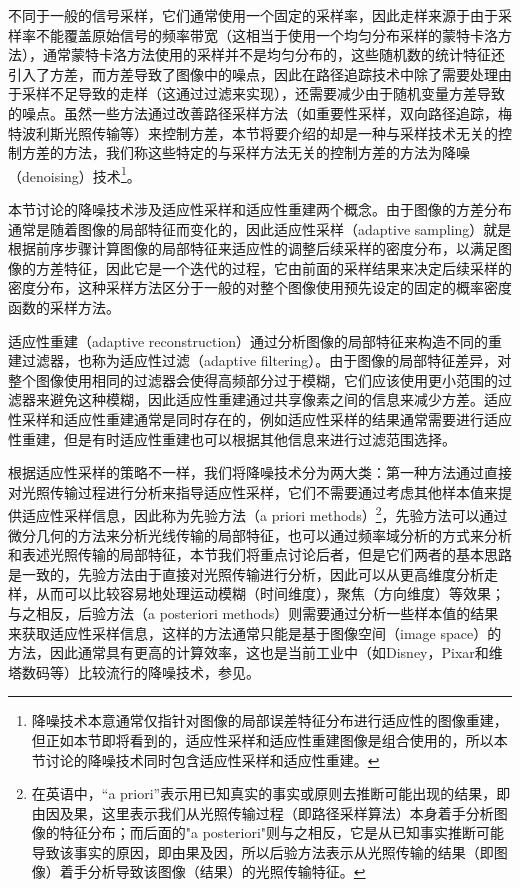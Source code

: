 不同于一般的信号采样，它们通常使用一个固定的采样率，因此走样来源于由于采样率不能覆盖原始信号的频率带宽（这相当于使用一个均匀分布采样的蒙特卡洛方法），通常蒙特卡洛方法使用的采样并不是均匀分布的，这些随机数的统计特征还引入了方差，而方差导致了图像中的噪点，因此在路径追踪技术中除了需要处理由于采样不足导致的走样（这通过过滤来实现），还需要减少由于随机变量方差导致的噪点。虽然一些方法通过改善路径采样方法（如重要性采样，双向路径追踪，梅特波利斯光照传输等）来控制方差，本节将要介绍的却是一种与采样技术无关的控制方差的方法，我们称这些特定的与采样方法无关的控制方差的方法为降噪（denoising）技术\footnote{降噪技术本意通常仅指针对图像的局部误差特征分布进行适应性的图像重建，但正如本节即将看到的，适应性采样和适应性重建图像是组合使用的，所以本节讨论的降噪技术同时包含适应性采样和适应性重建。}。

本节讨论的降噪技术涉及适应性采样和适应性重建两个概念。由于图像的方差分布通常是随着图像的局部特征而变化的，因此适应性采样（adaptive sampling）就是根据前序步骤计算图像的局部特征来适应性的调整后续采样的密度分布，以满足图像的方差特征，因此它是一个迭代的过程，它由前面的采样结果来决定后续采样的密度分布，这种采样方法区分于一般的对整个图像使用预先设定的固定的概率密度函数的采样方法。

适应性重建（adaptive reconstruction）通过分析图像的局部特征来构造不同的重建过滤器，也称为适应性过滤（adaptive filtering）。由于图像的局部特征差异，对整个图像使用相同的过滤器会使得高频部分过于模糊，它们应该使用更小范围的过滤器来避免这种模糊，因此适应性重建通过共享像素之间的信息来减少方差。适应性采样和适应性重建通常是同时存在的，例如适应性采样的结果通常需要进行适应性重建，但是有时适应性重建也可以根据其他信息来进行过滤范围选择。

根据适应性采样的策略不一样，我们将降噪技术分为两大类：第一种方法通过直接对光照传输过程进行分析来指导适应性采样，它们不需要通过考虑其他样本值来提供适应性采样信息，因此称为先验方法（a priori methods）\footnote{在英语中，“a priori”表示用已知真实的事实或原则去推断可能出现的结果，即由因及果，这里表示我们从光照传输过程（即路径采样算法）本身着手分析图像的特征分布；而后面的"a posteriori"则与之相反，它是从已知事实推断可能导致该事实的原因，即由果及因，所以后验方法表示从光照传输的结果（即图像）着手分析导致该图像（结果）的光照传输特征。}，先验方法可以通过微分几何的方法来分析光线传输的局部特征，也可以通过频率域分析的方式来分析和表述光照传输的局部特征，本节我们将重点讨论后者，但是它们两者的基本思路是一致的，先验方法由于直接对光照传输进行分析，因此可以从更高维度分析走样，从而可以比较容易地处理运动模糊（时间维度），聚焦（方向维度）等效果；与之相反，后验方法（a posteriori methods）则需要通过分析一些样本值的结果来获取适应性采样信息，这样的方法通常只能是基于图像空间（image space）的方法，因此通常具有更高的计算效率，这也是当前工业中（如Disney，Pixar和维塔数码等）比较流行的降噪技术，参见\cite{a:RecentAdvancesinAdaptiveSamplingandReconstructionforMonteCarloRendering}。








